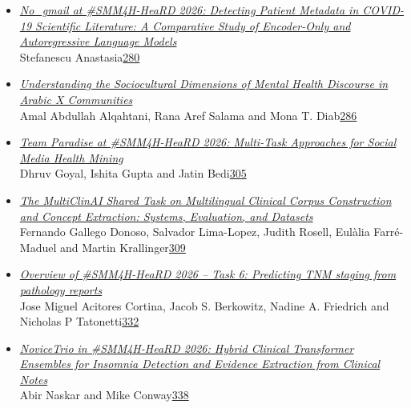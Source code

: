\documentclass[11pt,oneside]{book}
\begin{document}
\begin{itemize}[leftmargin=*,label={}]
       \item \hyperlink{page.280}{\emph{No\_gmail at \#SMM4H-HeaRD 2026: Detecting Patient Metadata in COVID-19 Scientific Literature: A Comparative Study of Encoder-Only and Autoregressive Language Models}}\\ \hspace*{2em} Stefanescu Anastasia\dotfill \hyperlink{page.280}{280}
       \item \hyperlink{page.286}{\emph{Understanding the Sociocultural Dimensions of Mental Health Discourse in Arabic X Communities}}\\ \hspace*{2em} Amal Abdullah Alqahtani, Rana Aref Salama and Mona T. Diab\dotfill \hyperlink{page.286}{286}
       \item \hyperlink{page.305}{\emph{Team Paradise at \#SMM4H-HeaRD 2026: Multi-Task Approaches for Social Media Health Mining}}\\ \hspace*{2em} Dhruv Goyal, Ishita Gupta and Jatin Bedi\dotfill \hyperlink{page.305}{305}
       \item \hyperlink{page.309}{\emph{The MultiClinAI Shared Task on Multilingual Clinical Corpus Construction and Concept Extraction: Systems, Evaluation, and Datasets}}\\ \hspace*{2em} Fernando Gallego Donoso, Salvador Lima-Lopez, Judith Rosell, Eulàlia Farré-Maduel and Martin Krallinger\dotfill \hyperlink{page.309}{309}
       \item \hyperlink{page.332}{\emph{Overview of \#SMM4H-HeaRD 2026 – Task 6: Predicting TNM staging from pathology reports}}\\ \hspace*{2em} Jose Miguel Acitores Cortina, Jacob S. Berkowitz, Nadine A. Friedrich and Nicholas P Tatonetti\dotfill \hyperlink{page.332}{332}
       \item \hyperlink{page.338}{\emph{NoviceTrio in \#SMM4H-HeaRD 2026: Hybrid Clinical Transformer Ensembles for Insomnia Detection and Evidence Extraction from Clinical Notes}}\\ \hspace*{2em} Abir Naskar and Mike Conway\dotfill \hyperlink{page.338}{338}

\end{itemize}
\end{document}
